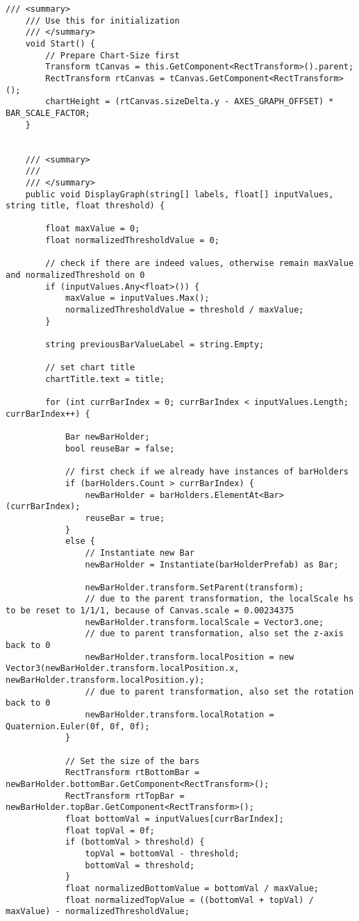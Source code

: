 \begin{lstlisting}[caption={/Assets/Scripts/Charts/BarChart.cs}, label={lst:scripts_charts_barchart}]
	/// <summary>
	/// Use this for initialization
	/// </summary>
	void Start() {
		// Prepare Chart-Size first
		Transform tCanvas = this.GetComponent<RectTransform>().parent;
		RectTransform rtCanvas = tCanvas.GetComponent<RectTransform>();
		chartHeight = (rtCanvas.sizeDelta.y - AXES_GRAPH_OFFSET) * BAR_SCALE_FACTOR;
	}
	
	
	/// <summary>
	/// 
	/// </summary>
	public void DisplayGraph(string[] labels, float[] inputValues, string title, float threshold) {
	
		float maxValue = 0;
		float normalizedThresholdValue = 0;
	
		// check if there are indeed values, otherwise remain maxValue and normalizedThreshold on 0
		if (inputValues.Any<float>()) {
			maxValue = inputValues.Max();
			normalizedThresholdValue = threshold / maxValue;
		}
	
		string previousBarValueLabel = string.Empty;
	
		// set chart title
		chartTitle.text = title;
	
		for (int currBarIndex = 0; currBarIndex < inputValues.Length; currBarIndex++) {
	
			Bar newBarHolder;
			bool reuseBar = false;
	
			// first check if we already have instances of barHolders
			if (barHolders.Count > currBarIndex) {
				newBarHolder = barHolders.ElementAt<Bar>(currBarIndex);
				reuseBar = true;
			}
			else {
				// Instantiate new Bar
				newBarHolder = Instantiate(barHolderPrefab) as Bar;
		
				newBarHolder.transform.SetParent(transform);
				// due to the parent transformation, the localScale hs to be reset to 1/1/1, because of Canvas.scale = 0.00234375
				newBarHolder.transform.localScale = Vector3.one;
				// due to parent transformation, also set the z-axis back to 0
				newBarHolder.transform.localPosition = new Vector3(newBarHolder.transform.localPosition.x, newBarHolder.transform.localPosition.y);
				// due to parent transformation, also set the rotation back to 0
				newBarHolder.transform.localRotation = Quaternion.Euler(0f, 0f, 0f);
			}
	
			// Set the size of the bars
			RectTransform rtBottomBar = newBarHolder.bottomBar.GetComponent<RectTransform>();
			RectTransform rtTopBar = newBarHolder.topBar.GetComponent<RectTransform>();
			float bottomVal = inputValues[currBarIndex];
			float topVal = 0f;
			if (bottomVal > threshold) {
				topVal = bottomVal - threshold;
				bottomVal = threshold;
			}
			float normalizedBottomValue = bottomVal / maxValue;
			float normalizedTopValue = ((bottomVal + topVal) / maxValue) - normalizedThresholdValue;
			

\end{lstlisting}
